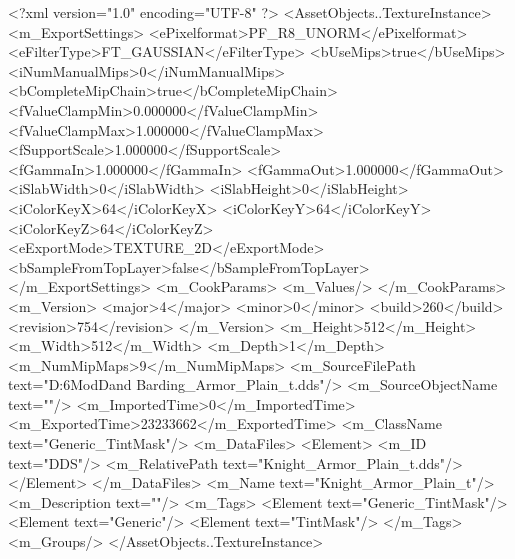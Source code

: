 <?xml version="1.0" encoding="UTF-8" ?>
<AssetObjects..TextureInstance>
	<m_ExportSettings>
		<ePixelformat>PF_R8_UNORM</ePixelformat>
		<eFilterType>FT_GAUSSIAN</eFilterType>
		<bUseMips>true</bUseMips>
		<iNumManualMips>0</iNumManualMips>
		<bCompleteMipChain>true</bCompleteMipChain>
		<fValueClampMin>0.000000</fValueClampMin>
		<fValueClampMax>1.000000</fValueClampMax>
		<fSupportScale>1.000000</fSupportScale>
		<fGammaIn>1.000000</fGammaIn>
		<fGammaOut>1.000000</fGammaOut>
		<iSlabWidth>0</iSlabWidth>
		<iSlabHeight>0</iSlabHeight>
		<iColorKeyX>64</iColorKeyX>
		<iColorKeyY>64</iColorKeyY>
		<iColorKeyZ>64</iColorKeyZ>
		<eExportMode>TEXTURE_2D</eExportMode>
		<bSampleFromTopLayer>false</bSampleFromTopLayer>
	</m_ExportSettings>
	<m_CookParams>
		<m_Values/>
	</m_CookParams>
	<m_Version>
		<major>4</major>
		<minor>0</minor>
		<build>260</build>
		<revision>754</revision>
	</m_Version>
	<m_Height>512</m_Height>
	<m_Width>512</m_Width>
	<m_Depth>1</m_Depth>
	<m_NumMipMaps>9</m_NumMipMaps>
	<m_SourceFilePath text="D:\Civ6Mod\3D\Crusader\Clothing and Barding\Knight_Armor_Plain_t.dds"/>
	<m_SourceObjectName text=""/>
	<m_ImportedTime>0</m_ImportedTime>
	<m_ExportedTime>23233662</m_ExportedTime>
	<m_ClassName text="Generic_TintMask"/>
	<m_DataFiles>
		<Element>
			<m_ID text="DDS"/>
			<m_RelativePath text="Knight_Armor_Plain_t.dds"/>
		</Element>
	</m_DataFiles>
	<m_Name text="Knight_Armor_Plain_t"/>
	<m_Description text=""/>
	<m_Tags>
		<Element text="Generic_TintMask"/>
		<Element text="Generic"/>
		<Element text="TintMask"/>
	</m_Tags>
	<m_Groups/>
</AssetObjects..TextureInstance>

 